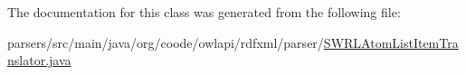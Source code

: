 The documentation for this class was generated from the following file\-:\begin{DoxyCompactItemize}
\item 
parsers/src/main/java/org/coode/owlapi/rdfxml/parser/\hyperlink{_s_w_r_l_atom_list_item_translator_8java}{S\-W\-R\-L\-Atom\-List\-Item\-Translator.\-java}\end{DoxyCompactItemize}
